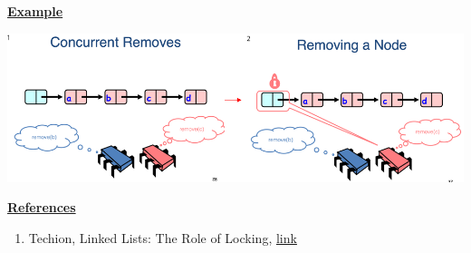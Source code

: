 \documentclass[12pt]{article}
\begin{document}
\begin{enumerate}[1.]
\begin{enumerate}[a)]
\begin{itemize}
\begin{itemize}
                \underline{\textbf{Example}}

                \bigskip

                \begin{center}
                \includegraphics[width=\linewidth]{../images/midterm_3_solution_3.png}
                \end{center}

            \end{itemize}
        \end{itemize}

        \bigskip

        \underline{\textbf{References}}

        \begin{enumerate}[1)]
            \item Techion, Linked Lists: The Role of Locking, \href{http://www.cs.technion.ac.il/~erez/courses/seminar/talks/05.pdf}{link}
        \end{enumerate}

    \end{enumerate}


\end{enumerate}
\end{document}
